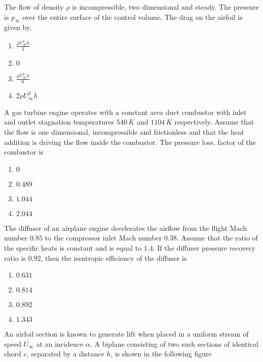 The flow of density $\rho$ is incompressible, two dimensional and steady. The pressure is $p_\infty$ over the entire surface of the control volume. The drag on the airfoil is given by,
        \begin{enumerate}
            \item $\frac{\rho U_\infty^2h}{3}$
            \item $0$
            \item $\frac{\rho U_\infty^2h}{6}$
            \item $2\rho U_\infty^2h$
        \end{enumerate}
    \item A gas turbine engine operates with a constant area duct combustor with inlet and outlet stagnation temperatures $540\, K$ and $1104\, K$ respectively. Assume that the flow is one dimensional, incompressible and frictionless and that the heat addition is driving the flow inside the combustor. The pressure loss, factor  of the combustor is 
            \begin{enumerate}
                \item $0$
                \item $0.489$
                \item $1.044$
                \item $2.044$
            \end{enumerate}
    \item The diffuser of an airplane engine decelerates the airflow from the flight Mach number $0.85$ to the compressor inlet Mach number $0.38$. Assume that the ratio of the specific heats is constant and is equal to $1.4$. If the diffuser pressure recovery ratio is $0.92$, then the isentropic efficiency of the diffuser is
        \begin{enumerate}
            \item $0.631$
            \item $0.814$
            \item $0.892$
            \item $1.343$
        \end{enumerate}
    \item An airfoil section is known to generate lift when placed in a uniform stream of speed $U_\infty$ at an incidence $\alpha$. A biplane consisting of two such sections of identical chord $c$, separated by a distance $h$, is shown in the following figure

